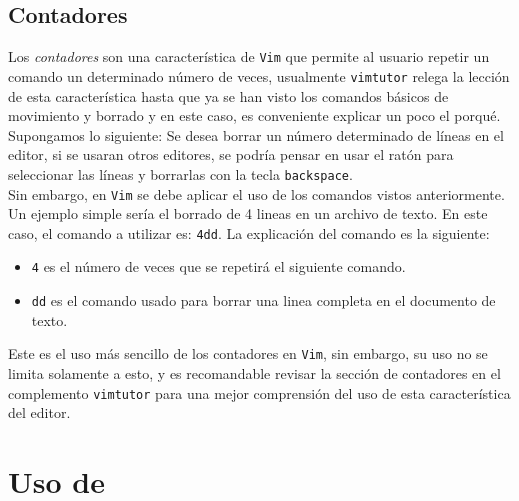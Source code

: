 \documentclass[10pt]{article}
\begin{document}
\subsection{Contadores}
Los \textit{contadores} son una característica de \texttt{Vim} que permite al usuario repetir un comando un determinado número de veces, usualmente \texttt{vimtutor} relega la lección de esta característica hasta que ya se han visto los comandos básicos de movimiento y borrado y en este caso, es conveniente explicar un poco el porqué. Supongamos lo siguiente: Se desea borrar un número determinado de líneas en el editor, si se usaran otros editores, se podría pensar en usar el ratón para seleccionar las líneas y borrarlas con la tecla \texttt{backspace}.\\
Sin embargo, en \texttt{Vim} se debe aplicar el uso de los comandos vistos anteriormente. Un ejemplo simple sería el borrado de 4 lineas en un archivo de texto. En este caso, el comando a utilizar es: \texttt{4dd}. La explicación del comando es la siguiente: 
\begin{itemize}
	\item \texttt{4} es el número de veces que se repetirá el siguiente comando. 
	\item \texttt{dd} es el comando usado para borrar una linea completa en el documento de texto. 
\end{itemize}
Este es el uso más sencillo de los contadores en \texttt{Vim}, sin embargo, su uso no se limita solamente a esto, y es recomandable revisar la sección de contadores en el complemento \texttt{vimtutor} para una mejor comprensión del uso de esta característica del editor.
\section{Uso de }
\end{document}
